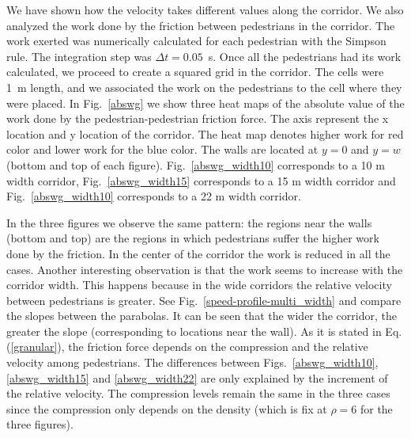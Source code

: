 We have shown how the velocity takes different values along the corridor. We also analyzed the work done by the friction between pedestrians in the corridor. The work exerted was numerically calculated for each pedestrian with the Simpson rule. The integration step was $\Delta t = 0.05$~s. Once all the pedestrians had its work calculated, we proceed to create a squared grid in the corridor. The cells were 1~m length, and we associated the work on the pedestrians to the cell where they were placed.  In Fig.~\ref{abswg} we show three heat maps of the absolute value of the work done by the pedestrian-pedestrian friction force. The axis represent the x location and y location of the corridor. The heat map denotes higher work for red color and lower work for the blue color. The walls are located at $y=0$ and $y=w$ (bottom and top of each figure). Fig.~\ref{abswg_width10} corresponds to a 10 m width corridor, Fig.~\ref{abswg_width15} corresponds to a 15 m width corridor and  Fig.~\ref{abswg_width10} corresponds to a 22 m width corridor.

In the three figures we observe the same pattern: the regions near the walls (bottom and top) are the regions in which pedestrians suffer the higher work done by the friction. In the center of the corridor the work is reduced in all the cases. Another interesting observation is that the work seems to increase with the corridor width. This happens because in the wide corridors the relative velocity between pedestrians is greater. See Fig.~\ref{speed-profile-multi_width} and compare the slopes between the parabolas. It can be seen that the wider the corridor, the greater the slope (corresponding to locations near the wall). As it is stated in Eq.(\ref{granular}), the friction force depends on the compression and the relative velocity among pedestrians. The differences between Figs.~\ref{abswg_width10}, \ref{abswg_width15} and  \ref{abswg_width22}  are only explained by the increment of the relative velocity. The compression levels remain the same in the three cases since the compression only depends on the density (which is fix at $\rho=6$ for the three figures).



